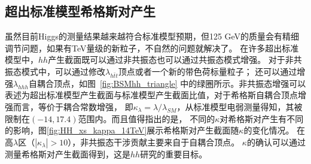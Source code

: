 \subsection{超出标准模型希格斯对产生}
虽然目前Higgs的测量结果越来越符合标准模型预期，但125 GeV的质量会有精细调节问题\cite{}，如果有TeV量级的新粒子，不自然的问题就解决了。
在许多超出标准模型中，$hh$产生截面既可以通过非共振态也可以通过共振态模式增强。
对于非共振态模式中，可以通过修改$\lambda_{h\bar{t}t}$顶点\cite{Grober:2010yv,Contino:2012xk}或者一个新的带色荷标量粒子\cite{Kribs:2012kz}；
还可以通过增强$\lambda_{hhh}$自耦合顶点，如图~\ref{fig:BSMhh_triangle}
中的绿圈所示。非共振态增强可以表述为超出标准模型产生截面与标准模型产生截面比值，对于希格斯自耦合顶点增强而言，等价于耦合常数增强，
即$\kappa_{\lambda}=\lambda/\lambda_{SM}$，从标准模型电弱测量得知，其被限制在$(-14, 17.4)$\cite{Kribs:2017znd}范围内。而且值得指出的是，
不同的$\kappa$对希格斯对产生有不同的影响\cite{Frederix:2014hta}，图\ref{fig:HH_xs_kappa_14TeV}展示希格斯对产生截面随$\kappa$的变化情况。
在高$\lambda$区（$|\kappa_{\lambda}|>10$），非共振态干涉贡献主要来自于自耦合顶点。
$\kappa$的确认可以通过测量希格斯对产生截面得到，这是$hh$研究的重要目标。
